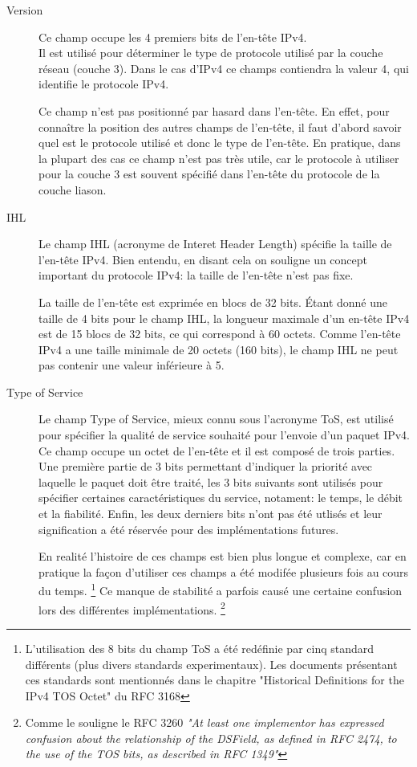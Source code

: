 \begin{description}
\item [Version] 
Ce champ occupe les 4 premiers bits de l'en-tête IPv4.\\
Il est utilisé pour déterminer le type de protocole utilisé par la couche
réseau (couche 3). Dans le cas d'IPv4 ce champs contiendra la valeur
4, qui identifie le protocole IPv4.

Ce champ n'est pas positionné par hasard dans l'en-tête. En effet, pour
connaître la position des autres champs de l'en-tête, il faut d'abord savoir
quel est le protocole utilisé et donc le type de l'en-tête.
En pratique, dans la plupart des cas ce champ n'est pas très utile, car le
protocole à utiliser pour la couche 3 est souvent spécifié dans l'en-tête du
protocole de la couche liason.

\item [IHL]
Le champ IHL (acronyme de Interet Header Length) spécifie la taille de l'en-tête IPv4. 
Bien entendu, en disant cela on souligne un concept important du protocole IPv4: 
la taille de l'en-tête n'est pas fixe.

La taille de l'en-tête est exprimée en blocs de 32 bits. Étant donné une taille de
4 bits pour le champ IHL, la longueur maximale d'un en-tête IPv4 est de 15 blocs de
32 bits, ce qui correspond à 60 octets. Comme l'en-tête IPv4 a une taille minimale
de 20 octets (160 bits), le champ IHL ne peut pas contenir une valeur inférieure à 5.

\item [Type of Service]
Le champ Type of Service, mieux connu sous l'acronyme ToS, est utilisé pour 
spécifier la qualité de service souhaité pour l'envoie d'un paquet IPv4.
Ce champ occupe un octet de l'en-tête et il est composé de trois parties.
Une première partie de 3 bits permettant d'indiquer la priorité avec laquelle
le paquet doit être traité, les 3 bits suivants sont utilisés pour spécifier 
certaines caractéristiques du service, notament: le temps, le débit et la fiabilité.
Enfin, les deux derniers bits n'ont pas été utlisés et leur signification a été 
réservée pour des implémentations futures.

En realité l'histoire de ces champs est bien plus longue et complexe,
car en pratique la façon d'utiliser ces champs a été modifée plusieurs fois au 
cours du temps.
\footnote{L'utilisation des 8 bits du champ ToS a été redéfinie
par cinq standard différents (plus divers standards experimentaux).
Les documents présentant ces standards sont mentionnés dans le chapitre 
"Historical Definitions for the IPv4 TOS Octet" du RFC 3168}
Ce manque de stabilité a parfois causé une certaine confusion lors des différentes implémentations.
\footnote{Comme le souligne le RFC 3260 {\it "At least one implementor has expressed confusion about the
relationship of the DSField, as defined in RFC 2474, to the use of
the TOS bits, as described in RFC 1349"}}


\end{description}
